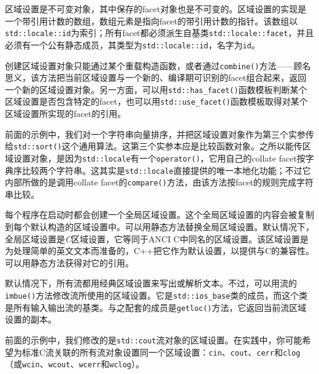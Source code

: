 
区域设置是不可变对象，其中保存的facet对象也是不可变的。区域设置的实现是一个带引用计数的数组，数组元素是指向facet的带引用计数的指针。该数组以\texttt{std::\allowbreak{}locale::\allowbreak{}id}为索引；所有facet都必须派生自基类\texttt{std::\allowbreak{}locale::\allowbreak{}facet}，并且必须有一个公有静态成员，其类型为\texttt{std::\allowbreak{}locale::\allowbreak{}id}，名字为\texttt{id}。



创建区域设置对象只能通过某个重载构造函数，或者通过\texttt{combine()}方法——顾名思义，该方法把当前区域设置与一个新的、编译期可识别的facet组合起来，返回一个新的区域设置对象。另一方面，可以用\texttt{std::\allowbreak{}has\_\allowbreak{}facet()}函数模板判断某个区域设置是否包含特定的facet，也可以用\texttt{std::\allowbreak{}use\_\allowbreak{}facet()}函数模板取得对某个区域设置所实现的facet的引用。



前面的示例中，我们对一个字符串向量排序，并把区域设置对象作为第三个实参传给\texttt{std::\allowbreak{}sort()}这个通用算法。这第三个实参本应是比较函数对象。之所以能传区域设置对象，是因为\texttt{std::\allowbreak{}locale}有一个\texttt{operator()}，它用自己的collate facet按字典序比较两个字符串。这其实是\texttt{std::\allowbreak{}locale}直接提供的唯一本地化功能；不过它内部所做的是调用collate facet的\texttt{compare()}方法，由该方法按facet的规则完成字符串比较。



每个程序在启动时都会创建一个全局区域设置。这个全局区域设置的内容会被复制到每个默认构造的区域设置中。可以用静态方法替换全局区域设置。默认情况下，全局区域设置是\textit{C}区域设置，它等同于ANCI C中同名的区域设置。该区域设置是为处理简单的英文文本而准备的，C++把它作为默认设置，以提供与C的兼容性。可以用静态方法获得对它的引用。



默认情况下，所有流都用经典区域设置来写出或解析文本。不过，可以用流的\texttt{imbue()}方法修改流所使用的区域设置。它是\texttt{std::\allowbreak{}ios\_\allowbreak{}base}类的成员，而这个类是所有输入输出流的基类。与之配套的成员是\texttt{getloc()}方法，它返回当前流区域设置的副本。



\begin{myNote}
前面的示例中，我们修改的是\texttt{std::\allowbreak{}cout}流对象的区域设置。在实践中，你可能希望为标准C流关联的所有流对象设置同一个区域设置：\texttt{cin}、\texttt{cout}、\texttt{cerr}和\texttt{clog}（或\texttt{wcin}、\texttt{wcout}、\texttt{wcerr}和\texttt{wclog}）。
\end{myNote}


